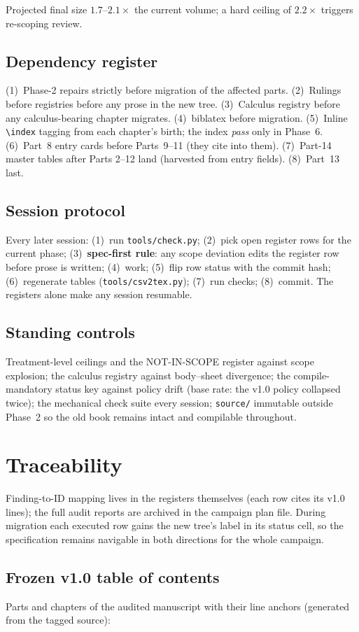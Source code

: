 \documentclass[11pt,letterpaper]{article}
\begin{document}
\noindent Projected final size $1.7$--$2.1\times$ the current volume; a
hard ceiling of $2.2\times$ triggers re-scoping review.

\subsection{Dependency register}
(1)~Phase-2 repairs strictly before migration of the affected parts.
(2)~Rulings before registries before any prose in the new tree.
(3)~Calculus registry before any calculus-bearing chapter migrates.
(4)~biblatex before migration.  (5)~Inline \verb|\index| tagging from
each chapter's birth; the index \emph{pass} only in Phase~6.
(6)~Part~8 entry cards before Parts~9--11 (they cite into them).
(7)~Part-14 master tables after Parts 2--12 land (harvested from entry
fields).  (8)~Part~13 last.

\subsection{Session protocol}
Every later session: (1)~run \texttt{tools/check.py}; (2)~pick open
register rows for the current phase; (3)~\textbf{spec-first rule}: any
scope deviation edits the register row before prose is written;
(4)~work; (5)~flip row status with the commit hash; (6)~regenerate
tables (\texttt{tools/csv2tex.py}); (7)~run checks; (8)~commit.  The
registers alone make any session resumable.

\subsection{Standing controls}
Treatment-level ceilings and the NOT-IN-SCOPE register against scope
explosion; the calculus registry against body--sheet divergence; the
compile-mandatory status key against policy drift (base rate: the v1.0
policy collapsed twice); the mechanical check suite every session;
\texttt{source/} immutable outside Phase~2 so the old book remains
intact and compilable throughout.

\section{Traceability}
\label{sec:traceability}

Finding-to-ID mapping lives in the registers themselves (each row cites
its v1.0 lines); the full audit reports are archived in the campaign
plan file.  During migration each executed row gains the new tree's
label in its status cell, so the specification remains navigable in both
directions for the whole campaign.

\subsection{Frozen v1.0 table of contents}
Parts and chapters of the audited manuscript with their line anchors
(generated from the tagged source):


\end{document}
